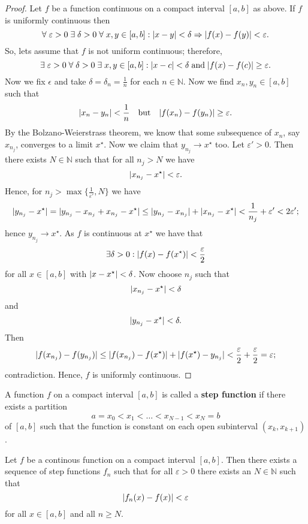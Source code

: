 \begin{proof}
    Let $f$ be a function continuous on a compact interval $[a, b]$ as above. If $f$ is uniformly continuous then \[ \forall \; \varepsilon > 0 \; \exists \; \delta > 0 \; \forall \; x, y \in [a, b]: \lvert x - y\rvert < \delta \Rightarrow \lvert f(x) - f(y)\rvert < \varepsilon. \] So, lets assume that $f$ is not uniform continuous; therefore, \[ \exists \; \varepsilon > 0 \; \forall \; \delta > 0 \; \exists \; x, y \in [a, b]: \lvert x - c\rvert < \delta \; \text{and} \; \lvert f(x) - f(c)\rvert \geq \varepsilon. \] Now we fix $\epsilon$ and take $\delta = \delta_n = \frac1n$ for each $n \in \mathbb N$. Now we find $x_n, y_n \in [a, b]$ such that \[ \lvert x_n - y_n\rvert < \frac1n \quad \text{but} \quad \lvert f(x_n) - f(y_n)\rvert \geq \varepsilon. \] By the Bolzano-Weierstrass theorem, we know that some subsequence of $x_n$, say $x_{n_j}$, converges to a limit $x^\star$. Now we claim that $y_{n_j} \to x^\star$ too. Let $\varepsilon' > 0$. Then there exists $N \in \mathbb N$ such that for all $n_j > N$ we have \[ \lvert x_{n_j} - x^\star\rvert < \varepsilon. \] Hence, for $n_j > \max \{ \frac{1}{\varepsilon'}, N \}$ we have \[ \lvert y_{n_j} - x^\star\rvert = \lvert y_{n_j} - x_{n_j} + x_{n_j} - x^\star\rvert \leq \lvert y_{n_j} - x_{n_j}\rvert + \lvert x_{n_j} - x^\star\rvert < \frac{1}{n_j} + \varepsilon' < 2 \varepsilon'; \] hence $y_{n_j} \to x^\star$. As $f$ is continuous at $x^\star$ we have that \[ \exists \delta > 0: \lvert f(x) - f(x^\star)\rvert < \frac{\varepsilon}{2} \] for all $x \in [a, b]$ with $\lvert x - x^\star\rvert < \delta$. Now choose $n_j$ such that \[ \lvert x_{n_j} - x^\star\rvert < \delta \] and \[ \lvert y_{n_j} - x^\star\rvert < \delta. \] Then \[ \lvert f(x_{n_j}) - f(y_{n_j})\rvert \leq \lvert f(x_{n_j}) - f(x^\star)\rvert + \lvert f(x^\star) - y_{n_j}\rvert < \frac{\varepsilon}{2} + \frac{\varepsilon}{2} = \varepsilon; \] contradiction. Hence, $f$ is uniformly continuous.
\end{proof}

\begin{definition}
    A function $f$ on a compact interval $[a, b]$ is called a \textbf{step function} if there exists a partition \[ a = x_0 < x_1 < \ldots < x_{N-1} < x_N = b \] of $[a, b]$ such that the function is constant on each open subinterval $(x_k, x_{k + 1})$.
\end{definition}

\begin{theorem}
    Let $f$ be a continous function on a compact interval $[a, b]$. Then there exists a sequence of step functions $f_n$ such that for all $\varepsilon > 0$ there exists an $N \in \mathbb N$ such that \[ \lvert f_n(x) - f(x)\rvert < \varepsilon \] for all $x \in [a, b]$ and all $n \geq N$.
\end{theorem}


